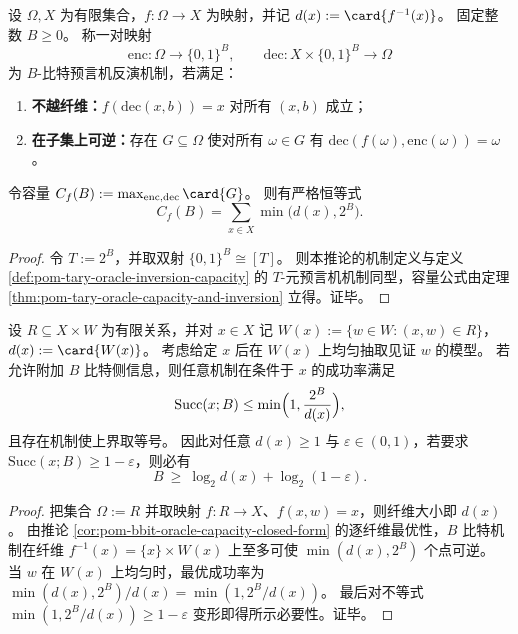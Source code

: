 \begin{corollary}\label{cor:pom-bbit-oracle-capacity-closed-form}
设 \(\Omega,X\) 为有限集合，\(f:\Omega\to X\) 为映射，并记 \(d(x):=\card{f^{-1}(x)}\)。
固定整数 \(B\ge 0\)。
称一对映射
\[
\mathrm{enc}:\Omega\to\{0,1\}^{B},
\qquad
\mathrm{dec}:X\times\{0,1\}^{B}\to\Omega
\]
为 \(B\)-比特预言机反演机制，若满足：
\begin{enumerate}
\normalfont
  \item \textbf{不越纤维：}\(f(\mathrm{dec}(x,b))=x\) 对所有 \((x,b)\) 成立；
  \item \textbf{在子集上可逆：}存在 \(G\subseteq\Omega\) 使对所有 \(\omega\in G\) 有 \(\mathrm{dec}(f(\omega),\mathrm{enc}(\omega))=\omega\)。
\end{enumerate}
令容量
\(
C_f(B):=\max_{\mathrm{enc},\mathrm{dec}}\card{G}
\)。
则有严格恒等式
\[
\boxed{\;
C_f(B)=\sum_{x\in X}\min\bigl(d(x),2^{B}\bigr).\;}
\]
\end{corollary}
\begin{proof}
令 \(T:=2^B\)，并取双射 \(\{0,1\}^B\cong [T]\)。
则本推论的机制定义与定义 \ref{def:pom-tary-oracle-inversion-capacity} 的 \(T\)-元预言机机制同型，容量公式由定理 \ref{thm:pom-tary-oracle-capacity-and-inversion} 立得。证毕。
\end{proof}

\begin{corollary}[见证关系上的最优成功率与必要侧信息]\label{cor:pom-witness-extraction-optimal-success}
设 \(R\subseteq X\times W\) 为有限关系，并对 \(x\in X\) 记 \(W(x):=\{w\in W:(x,w)\in R\}\)，\(d(x):=\card{W(x)}\)。
考虑给定 \(x\) 后在 \(W(x)\) 上均匀抽取见证 \(w\) 的模型。
若允许附加 \(B\) 比特侧信息，则任意机制在条件于 \(x\) 的成功率满足
\[
\mathrm{Succ}(x;B)\le \min\Bigl(1,\frac{2^{B}}{d(x)}\Bigr),
\]
且存在机制使上界取等号。
因此对任意 \(d(x)\ge 1\) 与 \(\varepsilon\in(0,1)\)，若要求 \(\mathrm{Succ}(x;B)\ge 1-\varepsilon\)，则必有
\[
B\ \ge\ \log_2 d(x)+\log_2(1-\varepsilon).
\]
\end{corollary}
\begin{proof}
把集合 \(\Omega:=R\) 并取映射 \(f:R\to X\)、\(f(x,w)=x\)，则纤维大小即 \(d(x)\)。
由推论 \ref{cor:pom-bbit-oracle-capacity-closed-form} 的逐纤维最优性，\(B\) 比特机制在纤维 \(f^{-1}(x)=\{x\}\times W(x)\) 上至多可使 \(\min(d(x),2^B)\) 个点可逆。
当 \(w\) 在 \(W(x)\) 上均匀时，最优成功率为 \(\min(d(x),2^B)/d(x)=\min(1,2^B/d(x))\)。
最后对不等式 \(\min(1,2^B/d(x))\ge 1-\varepsilon\) 变形即得所示必要性。证毕。
\end{proof}

